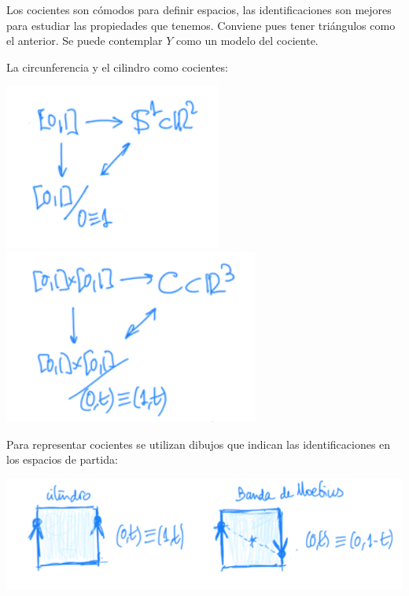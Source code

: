 \begin{pg}
    Los cocientes son cómodos para definir espacios, las identificaciones son mejores para estudiar las propiedades que tenemos. Conviene pues tener triángulos como el anterior. Se puede contemplar $Y$ como un modelo del cociente.
\end{pg}

\begin{ej}[Anteriores]
La circunferencia y el cilindro como cocientes:
\begin{center}
    \includegraphics[scale=0.4]{images/ej_cociente_1} 
    \includegraphics[scale=0.4]{images/ej_cociente_2}
\end{center}

Para representar cocientes se utilizan dibujos que indican las identificaciones en los espacios de partida:
\begin{center}
    \includegraphics[scale=0.3]{images/ej_cociente_3} 
\end{center}
\end{ej}


